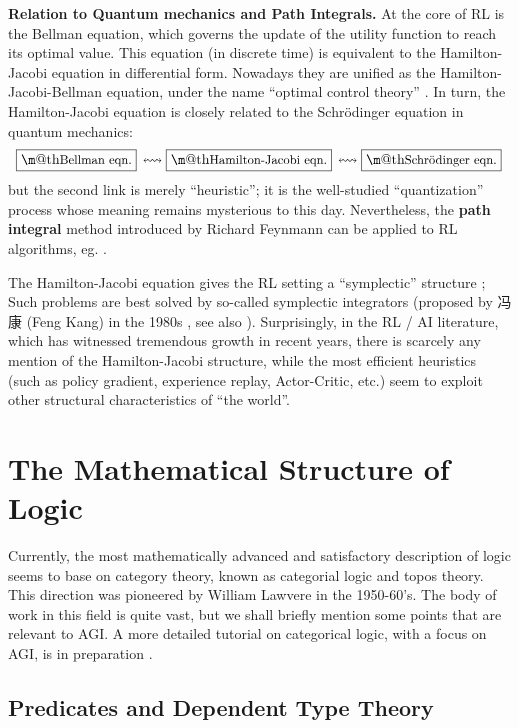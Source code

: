 \documentclass[orivec]{llncs}
\makeatletter
\renewcommand{\boxed}[1]{\fbox{\m@th$\displaystyle\scalebox{0.9}{#1}$} \,}
\makeatother
\begin{document}
\textbf{Relation to Quantum mechanics and Path Integrals.}  At the core of RL is the Bellman equation, which governs the update of the utility function to reach its optimal value.  This equation (in discrete time) is equivalent to the Hamilton-Jacobi equation in differential form.  Nowadays they are unified as the Hamilton-Jacobi-Bellman equation, under the name ``optimal control theory'' \cite{Liberzon2012}.  In turn, the Hamilton-Jacobi equation is closely related to the Schr\"{o}dinger equation in quantum mechanics:
\begin{equation}
\boxed{\mbox{Bellman eqn.}} \leftrightsquigarrow \boxed{\mbox{Hamilton-Jacobi eqn.}} \leftrightsquigarrow \boxed{\mbox{Schr\"{o}dinger eqn.}}
\end{equation}
but the second link is merely ``heuristic'';  it is the well-studied ``quantization'' process whose meaning remains mysterious to this day.  Nevertheless, the \textbf{path integral} method introduced by Richard Feynmann can be applied to RL algorithms, eg. \cite{Kappen2007}.

The Hamilton-Jacobi equation gives the RL setting a ``symplectic'' structure \cite{Mann2018};  Such problems are best solved by so-called symplectic integrators (proposed by 冯康 (Feng Kang) in the 1980s \cite{Feng2010}, see also \cite{Leimkuhler2004}).  Surprisingly, in the RL / AI literature, which has witnessed tremendous growth in recent years, there is scarcely any mention of the Hamilton-Jacobi structure, while the most efficient heuristics (such as policy gradient, experience replay, Actor-Critic, etc.) seem to exploit other structural characteristics of ``the world''.

\section{The Mathematical Structure of Logic}

Currently, the most mathematically advanced and satisfactory description of logic seems to base on category theory, known as categorial logic and topos theory.  This direction was pioneered by William Lawvere in the 1950-60's.  The body of work in this field is quite vast, but we shall briefly mention some points that are relevant to AGI.  A more detailed tutorial on categorical logic, with a focus on AGI, is in preparation \cite{Yan2021}.

\subsection{Predicates and Dependent Type Theory}
\label{sec:dependent-types}
\end{document}
